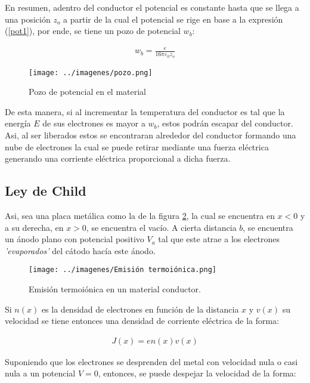 \documentclass[%
 reprint,
 amsmath,amssymb,
 aps,
]{revtex4-2}
\begin{document}
\vspace{0.2 cm}
En resumen, adentro del conductor el potencial es constante hasta que se llega a una posición $z_o$ a partir de la cual el potencial se rige en base a la expresión (\ref{pot1}), por ende, se tiene un pozo de potencial $w_b$:

\begin{align*}
    w_b = \frac{e}{16\pi \varepsilon_{0}z_o}
\end{align*}

\begin{figure}[H]
    \centering
    \texttt{[image: ../imagenes/pozo.png]}
    \caption{Pozo de potencial en el material}
    \label{fig:1}
\end{figure}

\vspace{0.2 cm}
De esta manera, si al incrementar la temperatura del conductor es tal que la energía $E$ de sus electrones es mayor a $w_b$, estos podrán escapar del conductor. Asi, al ser liberados estos se encontraran alrededor del conductor formando una nube de electrones la cual se puede retirar mediante una fuerza eléctrica generando una corriente eléctrica proporcional a dicha fuerza.

\subsection{Ley de Child}
Asi, sea una placa metálica como la de la figura \ref{em1}, la cual se encuentra en $x<0$ y a su derecha, en $x>0$, se encuentra el vacío. A cierta distancia $b$, se encuentra un ánodo plano con potencial positivo $V_{a}$ tal que este atrae a los electrones \textit{'evaporados'} del cátodo hacía este ánodo.

\begin{figure}[H]
    \centering
    \texttt{[image: ../imagenes/Emisión termoiónica.png]}
    \caption{Emisión termoiónica en un material conductor.}
    \label{em1}
\end{figure}

\vspace{0.2 cm}
Si $n(x)$ es la densidad de electrones en función de la distancia $x$ y $v(x)$ su velocidad se tiene entonces una densidad de corriente eléctrica de la forma:

\begin{align*}
    J(x) = en(x)v(x)
\end{align*}

\vspace{0.2 cm}
Suponiendo que los electrones se desprenden del metal con velocidad nula o casi nula a un potencial $V= 0$, entonces, se puede despejar la velocidad de la forma:
\end{document}
